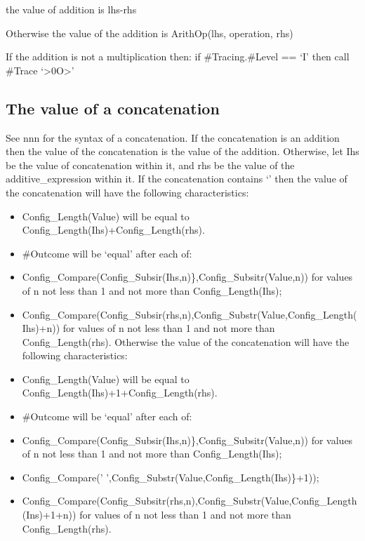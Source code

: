 the value of addition is lhs-rhs

Otherwise the value of the addition is ArithOp(lhs, operation, rhs)

If the addition is not a multiplication then: if \#Tracing.\#Level ==
`I' then call \#Trace `\textgreater0O\textgreater{}'

\subsection{The value of a
concatenation}\label{the-value-of-a-concatenation}

See nnn for the syntax of a concatenation. If the concatenation is an
addition then the value of the concatenation is the value of the
addition. Otherwise, let Ihs be the value of concatenation within it,
and rhs be the value of the additive\_expression within it. If the
concatenation contains `\textbar\textbar{}' then the value of the
concatenation will have the following characteristics:

\begin{itemize}
\item
  Config\_Length(Value) will be equal to
  Config\_Length(Ihs)+Config\_Length(rhs).
\item
  \#Outcome will be `equal' after each of:
\item
  Config\_Compare(Config\_Subsir(Ihs,n)\},Config\_Subsitr(Value,n)) for
  values of n not less than 1 and not more than Config\_Length(Ihs);
\item
  Config\_Compare(Config\_Subsir(rhs,n),Config\_Substr(Value,Config\_Length(Ihs)+n))
  for values of n not less than 1 and not more than Config\_Length(rhs).
  Otherwise the value of the concatenation will have the following
  characteristics:
\item
  Config\_Length(Value) will be equal to
  Config\_Length(Ihs)+1+Config\_Length(rhs).
\item
  \#Outcome will be `equal' after each of:
\item
  Config\_Compare(Config\_Subsir(Ihs,n)\},Config\_Subsitr(Value,n)) for
  values of n not less than 1 and not more than Config\_Length(Ihs);
\item
  Config\_Compare(' ',Config\_Substr(Value,Config\_Length(Ihs)\}+1));
\item
  Config\_Compare(Config\_Subsitr(rhs,n),Config\_Substr(Value,Config\_Length(Ins)+1+n))
  for values of n not less than 1 and not more than Config\_Length(rhs).
\end{itemize}

